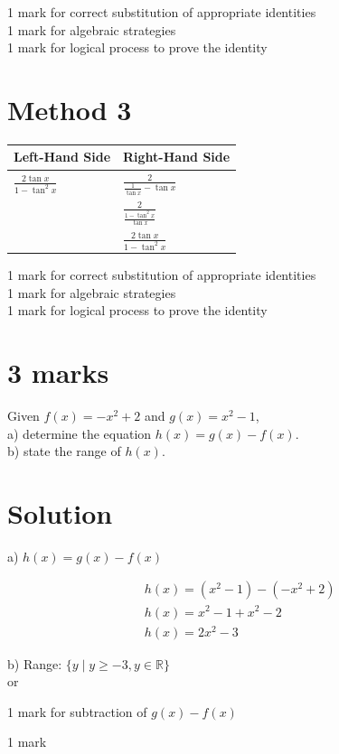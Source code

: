 \documentclass[10pt]{article}
\begin{document}
1 mark for correct substitution of appropriate identities\\
1 mark for algebraic strategies\\
1 mark for logical process to prove the identity

\section*{Method 3}
\begin{center}
\begin{tabular}{|l|l|}
\hline
Left-Hand Side & Right-Hand Side \\
\hline
$\frac{2 \tan x}{1-\tan ^{2} x}$ & $\frac{2}{\frac{1}{\tan x}-\tan x}$ \\
\hline
 & $\frac{2}{\frac{1-\tan ^{2} x}{\tan x}}$ \\
\hline
 & $\frac{2 \tan x}{1-\tan ^{2} x}$ \\
\hline
\end{tabular}
\end{center}

1 mark for correct substitution of appropriate identities\\
1 mark for algebraic strategies\\
1 mark for logical process to prove the identity

\section*{3 marks}
Given $f(x)=-x^{2}+2$ and $g(x)=x^{2}-1$,\\
a) determine the equation $h(x)=g(x)-f(x)$.\\
b) state the range of $h(x)$.

\section*{Solution}
a) $h(x)=g(x)-f(x)$

$$
\begin{aligned}
& h(x)=\left(x^{2}-1\right)-\left(-x^{2}+2\right) \\
& h(x)=x^{2}-1+x^{2}-2 \\
& h(x)=2 x^{2}-3
\end{aligned}
$$

b) Range: $\{y \mid y \geq-3, y \in \mathbb{R}\}$\\
or

1 mark for subtraction of $g(x)-f(x)$

1 mark
\end{document}
